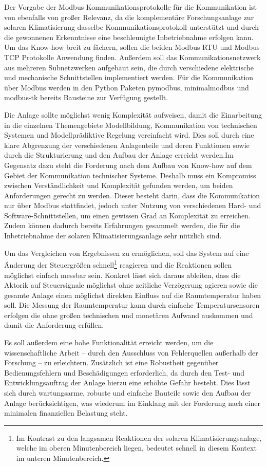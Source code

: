Der Vorgabe der Modbus Kommunikationsprotokolle für die Kommunikation ist von ebenfalls von großer Relevanz, da die komplementäre Forschungsanlage zur solaren Klimatisierung dasselbe Kommunikationsprotokoll unterstützt und durch die gewonnenen Erkenntnisse eine beschleunigte Inbetriebnahme erfolgen kann. Um das Know-how breit zu fächern, sollen die beiden Modbus RTU und Modbus TCP Protokolle Anwendung finden. Außerdem soll das Kommunikationsnetzwerk aus mehreren Subnetzwerken aufgebaut sein, die durch verschiedene elektrische und mechanische Schnittstellen implementiert werden. Für die Kommunikation über Modbus werden in den Python Paketen pymodbus, minimalmodbus und modbus-tk bereits Bausteine zur Verfügung gestellt.

Die Anlage sollte möglichst wenig Komplexität aufweisen, damit die Einarbeitung in die einzelnen Themengebiete Modellbildung, Kommunikation von technischen Systemen und Modellprädiktive Regelung vereinfacht wird. Dies soll durch eine klare Abgrenzung der verschiedenen Anlagenteile und deren Funktionen sowie durch die Strukturierung und den Aufbau der Anlage erreicht werden.Im Gegensatz dazu steht die Forderung nach dem Aufbau von Know-how auf dem Gebiet der Kommunikation technischer Systeme. Deshalb muss ein Kompromiss zwischen Verständlichkeit und Komplexität gefunden werden, um beiden Anforderungen gerecht zu werden. Dieser besteht darin, dass die Kommunikation nur über Modbus stattfindet, jedoch unter Nutzung von verschiedenen Hard- und Software-Schnittstellen, um einen gewissen Grad an Komplexität zu erreichen. Zudem können dadurch bereits Erfahrungen gesammelt werden, die für die Inbetriebnahme der solaren Klimatisierungsanlage sehr nützlich sind. 

Um das Vergleichen von Ergebnissen zu ermöglichen, soll das System auf eine Änderung der Steuergrößen schnell\footnote{Im Kontrast zu den langsamen Reaktionen der solaren Klimatisierungsanlage, welche im oberen Minutenbereich liegen, bedeutet schnell in diesem Kontext im unteren Minutenbereich.} reagieren und die Reaktionen sollen möglichst einfach messbar sein. 
Konkret lässt sich daraus ableiten, dass die Aktorik auf Steuersignale möglichst ohne zeitliche Verzögerung agieren sowie die gesamte Anlage einen möglichst direkten Einfluss auf die Raumtemperatur haben soll. 
Die Messung der Raumtemperatur kann durch einfache Temperatursensoren erfolgen die ohne großen technischen und monetären Aufwand auskommen und damit die Anforderung erfüllen.

Es soll außerdem eine hohe Funktionalität erreicht werden, um die wissenschaftliche Arbeit -- durch den Ausschluss von Fehlerquellen außerhalb der Forschung -- zu erleichtern. 
Zusätzlich ist eine Robustheit gegenüber Bedienungsfehlern und Beschädigungen erforderlich, da durch den Test- und Entwicklungsauftrag der Anlage hierzu eine erhöhte Gefahr besteht. Dies lässt sich durch wartungsarme, robuste und einfache Bauteile sowie den Aufbau der Anlage berücksichtigen, was wiederum im Einklang mit der Forderung nach einer minimalen finanziellen Belastung steht.

